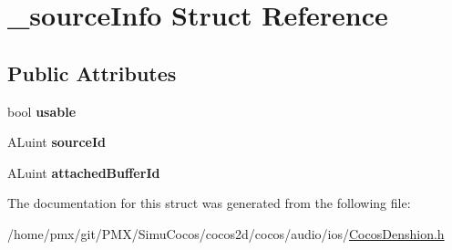 \hypertarget{struct__sourceInfo}{}\section{\+\_\+source\+Info Struct Reference}
\label{struct__sourceInfo}
\subsection*{Public Attributes}
\begin{DoxyCompactItemize}
\item 
\mbox{\label{struct__sourceInfo_a22f8eac8d5bdaf3f588680221397c387}} 
bool {\bfseries usable}
\item 
\mbox{\label{struct__sourceInfo_a23e87c0ede21db9523ed5e8464556ea8}} 
A\+Luint {\bfseries source\+Id}
\item 
\mbox{\label{struct__sourceInfo_a377ad6280a2b4a01f996118324431259}} 
A\+Luint {\bfseries attached\+Buffer\+Id}
\end{DoxyCompactItemize}


The documentation for this struct was generated from the following file\+:\begin{DoxyCompactItemize}
\item 
/home/pmx/git/\+P\+M\+X/\+Simu\+Cocos/cocos2d/cocos/audio/ios/\hyperlink{cocos2d_2cocos_2audio_2ios_2CocosDenshion_8h}{Cocos\+Denshion.\+h}\end{DoxyCompactItemize}
